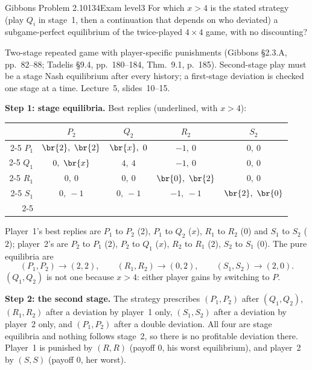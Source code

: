 \begin{exsol}{Gibbons Problem 2.10}{134}{Exam level}{3}
\asked For which $x > 4$ is the stated strategy (play $Q_i$ in stage~1, then a continuation that depends
on who deviated) a subgame-perfect equilibrium of the twice-played $4\times4$ game, with no discounting?

\method Two-stage repeated game with player-specific punishments (Gibbons \S2.3.A, pp.~82--88; Tadelis
\S9.4, pp.~180--184, Thm.~9.1, p.~185). Second-stage play must be a stage Nash equilibrium after every
history; a first-stage deviation is checked one stage at a time. Lecture~5, slides~10--15.

\solution
\textbf{Step 1: stage equilibria.} Best replies (underlined, with $x > 4$):
\begin{center}
\begin{tabular}{r|c|c|c|c|}
\multicolumn{1}{r}{} & \multicolumn{1}{c}{$P_2$} & \multicolumn{1}{c}{$Q_2$} & \multicolumn{1}{c}{$R_2$} & \multicolumn{1}{c}{$S_2$}\\ \cline{2-5}
$P_1$ & $\br{2},\ \br{2}$ & $\br{x},\ 0$ & $-1,\ 0$ & $0,\ 0$ \\ \cline{2-5}
$Q_1$ & $0,\ \br{x}$ & $4,\ 4$ & $-1,\ 0$ & $0,\ 0$ \\ \cline{2-5}
$R_1$ & $0,\ 0$ & $0,\ 0$ & $\br{0},\ \br{2}$ & $0,\ 0$ \\ \cline{2-5}
$S_1$ & $0,\ -1$ & $0,\ -1$ & $-1,\ -1$ & $\br{2},\ \br{0}$ \\ \cline{2-5}
\end{tabular}
\end{center}
Player~1's best replies are $P_1$ to $P_2$ (2), $P_1$ to $Q_2$ ($x$), $R_1$ to $R_2$ ($0$) and $S_1$ to $S_2$ ($2$);
player~2's are $P_2$ to $P_1$ (2), $P_2$ to $Q_1$ ($x$), $R_2$ to $R_1$ ($2$), $S_2$ to $S_1$ ($0$). The pure
equilibria are
\[
  (P_1,P_2) \to (2,2), \qquad (R_1,R_2) \to (0,2), \qquad (S_1,S_2) \to (2,0).
\]
$(Q_1,Q_2)$ is not one because $x > 4$: either player gains by switching to $P$.

\textbf{Step 2: the second stage.} The strategy prescribes $(P_1,P_2)$ after $(Q_1,Q_2)$, $(R_1,R_2)$ after
a deviation by player~1 only, $(S_1,S_2)$ after a deviation by player~2 only, and $(P_1,P_2)$ after a
double deviation. All four are stage equilibria and nothing follows stage~2, so there is no profitable
deviation there. Player~1 is punished by $(R,R)$ (payoff $0$, his worst equilibrium), and player~2 by
$(S,S)$ (payoff $0$, her worst).


\end{exsol}

